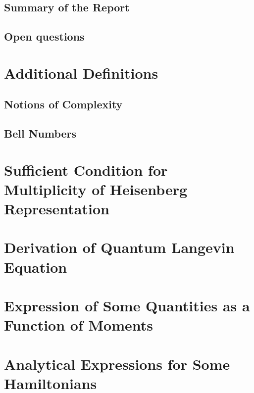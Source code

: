 \documentclass[a4paper,11pt,english]{report}
\begin{document}
\section{Summary of the Report}

\section{Open questions}

\newpage
\clearpage
{}
\printbibliography

\newpage
\clearpage
\appendix
\chapter{Additional Definitions} \label{def-app}
    \section{Notions of Complexity} \label{remind_comp}
        
    \section{Bell Numbers} \label{bell-append}
        
        
\chapter{Sufficient Condition for Multiplicity of Heisenberg Representation} \label{multi-heisenberg-multi}
    
    
\chapter{Derivation of Quantum Langevin Equation} \label{2-langevin}
    
    
\chapter{Expression of Some Quantities as a Function of Moments} \label{app-all-moments}
    
    
\chapter{Analytical Expressions for Some Hamiltonians} \label{app-analytic-exp}
    
\end{document}
